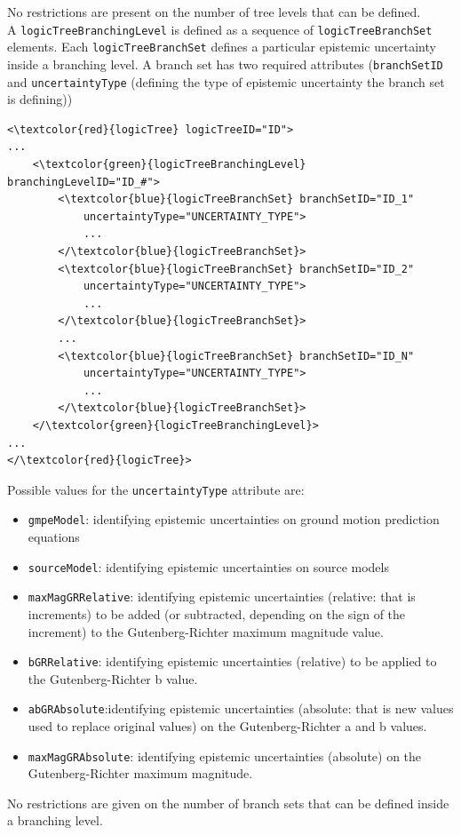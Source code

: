 No restrictions are present on the number of tree levels that can be defined.\\
A \Verb+logicTreeBranchingLevel+ is defined as a sequence of \Verb+logicTreeBranchSet+ elements. Each \Verb+logicTreeBranchSet+ defines a particular epistemic uncertainty inside a branching level. A branch set has two required attributes (\Verb+branchSetID+ and \Verb+uncertaintyType+ (defining the type of epistemic uncertainty the branch set is defining))
\begin{Verbatim}[frame=single, commandchars=\\\{\}, samepage=true]
<\textcolor{red}{logicTree} logicTreeID="ID">
...
	<\textcolor{green}{logicTreeBranchingLevel} branchingLevelID="ID_#">
		<\textcolor{blue}{logicTreeBranchSet} branchSetID="ID_1"
			uncertaintyType="UNCERTAINTY_TYPE">
			...
		</\textcolor{blue}{logicTreeBranchSet}>
		<\textcolor{blue}{logicTreeBranchSet} branchSetID="ID_2"
			uncertaintyType="UNCERTAINTY_TYPE">
			...
		</\textcolor{blue}{logicTreeBranchSet}>
		...
		<\textcolor{blue}{logicTreeBranchSet} branchSetID="ID_N"
			uncertaintyType="UNCERTAINTY_TYPE">
			...
		</\textcolor{blue}{logicTreeBranchSet}>
	</\textcolor{green}{logicTreeBranchingLevel}>
...
</\textcolor{red}{logicTree}>
\end{Verbatim}
Possible values for the \Verb+uncertaintyType+ attribute are:
\begin{itemize}
\item \Verb+gmpeModel+: identifying epistemic uncertainties on ground motion prediction equations
\item \Verb+sourceModel+: identifying epistemic uncertainties on source models
\item \Verb+maxMagGRRelative+: identifying epistemic uncertainties (relative: that is increments) to be added (or subtracted, depending on the sign of the increment) to the Gutenberg-Richter maximum magnitude value.
\item \Verb+bGRRelative+: identifying epistemic uncertainties (relative) to be applied to the Gutenberg-Richter b value.
\item \Verb+abGRAbsolute+:identifying epistemic uncertainties (absolute: that is new values used to replace original values) on the Gutenberg-Richter a and b values.
\item \Verb+maxMagGRAbsolute+: identifying epistemic uncertainties (absolute) on the Gutenberg-Richter maximum magnitude.
\end{itemize}
No restrictions are given on the number of branch sets that can be defined inside a branching level.\\
